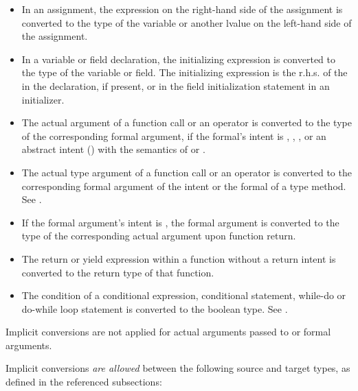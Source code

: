 \begin{itemize}
\item In an assignment, the expression on the right-hand side of
      the assignment is converted to the type of the variable
      or another lvalue on the left-hand side of the assignment.

\item In a variable or field declaration, the initializing expression
      is converted to the type of the variable or field.
      The initializing expression is the r.h.s. of the \chpl{=}
      in the declaration, if present, or in the field initialization
      statement in an initializer.

\item The actual argument of a function call or an operator is converted
      to the type of the corresponding formal argument, if the formal's
      intent is , , , or an abstract intent
      () with the semantics of
       or .

\item The actual type argument of a function call or an operator is converted
      to the corresponding formal argument of the  intent or
      the  formal of a type method.
      See .

\item If the formal argument's intent is , the formal argument
      is converted to the type of the corresponding actual argument
      upon function return.

\item The return or yield expression within a function without a 
      return intent is converted to the return type of that function.

\item The condition of a conditional expression,
      conditional statement, while-do or do-while loop statement
      is converted to the boolean type.
      See .
\end{itemize}

Implicit conversions are not applied for actual arguments passed to  or
 formal arguments.

Implicit conversions \emph{are allowed} between
the following source and target types,
as defined in the referenced subsections:

